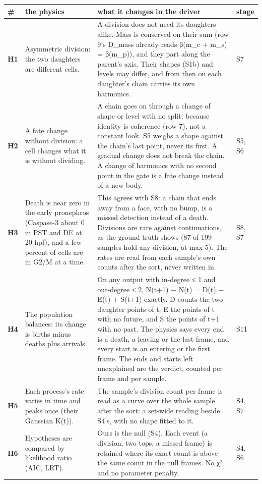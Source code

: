 {\footnotesize
\setlength{\tabcolsep}{6pt}
\begin{longtable}{>{\RaggedRight\arraybackslash}p{}>{\RaggedRight\arraybackslash}p{}>{\RaggedRight\arraybackslash}p{}>{\RaggedRight\arraybackslash}p{}}
\toprule
\# & the physics & what it changes in the driver & stage \\
\midrule
\endhead
\textbf{H1} & Asymmetric division: the two daughters are different cells. & A division does not need its daughters alike. Mass is conserved on their sum (row 9's D\_\allowbreak{}mass already reads β(m\_\allowbreak{}c + m\_\allowbreak{}s) = β(m\_\allowbreak{}p)), and they part along the parent's axis. Their shapes (S1b) and levels may differ, and from then on each daughter's chain carries its own harmonics. & S7 \\
\textbf{H2} & A fate change without division: a cell changes what it is without dividing. & A chain goes on through a change of shape or level with no split, because identity is coherence (row 7), not a constant look. S5 weighs a shape against the chain's last point, never its first. A gradual change does not break the chain. A change of harmonics with no second point in the gate is a fate change instead of a new body. & S5, S6 \\
\textbf{H3} & Death is near zero in the early pronephros (Caspase-3 about 0 in PST and DE at 20 hpf), and a few percent of cells are in G2/M at a time. & This agrees with S8: a chain that ends away from a face, with no bump, is a missed detection instead of a death. Divisions are rare against continuations, as the ground truth shows (87 of 199 samples hold any division, at max 5). The rates are read from each sample's own counts after the sort, never written in. & S8, S7 \\
\textbf{H4} & The population balances: its change is births minus deaths plus arrivals. & On any output with in-degree ≤ 1 and out-degree ≤ 2, N(t+1) − N(t) = D(t) − E(t) + S(t+1) exactly. D counts the two-daughter points of t, E the points of t with no future, and S the points of t+1 with no past. The physics says every end is a death, a leaving or the last frame, and every start is an entering or the first frame. The ends and starts left unexplained are the verdict, counted per frame and per sample. & S11 \\
\textbf{H5} & Each process's rate varies in time and peaks once (their Gaussian K(t)). & The sample's division count per frame is read as a curve over the whole sample after the sort: a set-wide reading beside S4's, with no shape fitted to it. & S4, S7 \\
\textbf{H6} & Hypotheses are compared by likelihood ratio (AIC, LRT). & Ours is the null (S4). Each event (a division, two tops, a missed frame) is retained where its exact count is above the same count in the null frames. No χ² and no parameter penalty. & S4, S6 \\
\bottomrule
\end{longtable}
}

